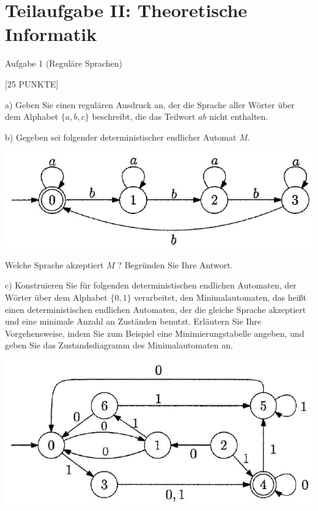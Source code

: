 \documentclass[10pt]{article}
\begin{document}
\section*{Teilaufgabe II: Theoretische Informatik}
Aufgabe 1 (Reguläre Sprachen)

[25 PUNKTE]

a) Geben Sie einen regulären Ausdruck an, der die Sprache aller Wörter über dem Alphabet $\{a, b, c\}$ beschreibt, die das Teilwort $a b$ nicht enthalten.

b) Gegeben sei folgender deterministischer endlicher Automat $M$.

\begin{center}
\includegraphics[max width=\textwidth]{2024_05_29_35588a07a9630e5c9887g-2}
\end{center}

Welche Sprache akzeptiert $M$ ? Begründen Sie Ihre Antwort.

c) Konstruieren Sie für folgenden deterministischen endlichen Automaten, der Wörter über dem Alphabet $\{0,1\}$ verarbeitet, den Minimalautomaten, das heißt einen deterministischen endlichen Automaten, der die gleiche Sprache akzeptiert und eine minimale Anzahl an Zuständen benutzt. Erläutern Sie Ihre Vorgehensweise, indem Sie zum Beispiel eine Minimierungstabelle angeben, und geben Sie das Zustandsdiagramm des Minimalautomaten an.

\begin{center}
\includegraphics[max width=\textwidth]{2024_05_29_35588a07a9630e5c9887g-2(1)}
\end{center}
\end{document}
